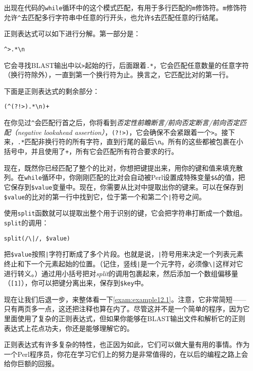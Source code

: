 出现在代码的\verb|while|循环中的这个模式匹配，有用于多行匹配的\verb|m|修饰符。\verb|m|修饰符允许\verb|^|去匹配多行字符串中任意的行开头，也允许\verb|$|去匹配任意的行结尾。

正则表达式可以如下进行分解。第一部分是：

\begin{lstlisting}
^>.*\n
\end{lstlisting}

它会寻找BLAST输出中以\verb|>|起始的行，后面跟着\verb|.*|，它会匹配任意数量的任意字符（换行符除外），一直到第一个换行符为止。换言之，它匹配比对的第一行。

下面是正则表达式的剩余部分：

\begin{lstlisting}
(^(?!>).*\n)+
\end{lstlisting}

在你见过\verb|^|会匹配行首之后，你将看到\textit{否定性前瞻断言/前向否定断言/前向否定匹配（negative lookahead assertion）}，\verb|(?!>)|，它会确保不会紧跟着一个\verb|>|。接下来，\verb|.*|匹配非换行符的所有字符，直到行尾的最后\verb|\n|。所有的这些都被包裹在小括号中，并且使用了\verb|+|，所有它会匹配所有符合要求的行。

现在，既然你已经匹配了整个的比对，你想把键提出来，用你的键和值来填充散列。在\verb|while|循环中，你刚刚匹配的比对会自动被Perl设置成特殊变量\verb|$&|的值，把它保存到\verb|$value|变量中。现在，你需要从比对中提取出你的键来。可以在保存到\verb|$value|的比对的第一行中找到它，位于第一个和第二个\verb=|=符号之间。

使用\verb|split|函数就可以提取出整个用于识别的键，它会把字符串打断成一个数组。\verb|split|的调用：

\begin{lstlisting}
split(/\|/, $value)
\end{lstlisting}

把\verb|$value|按照\verb=|=字符打断成了多个片段。也就是说，\verb=|=符号用来决定一个列表元素终止和下一个元素起始的位置。（记住，竖线\verb=|=是一个元字符，必须像\verb=\|=这样对它进行转义。）通过用小括号把对\textit{split}的调用包裹起来，然后添加一个数组偏移量（\verb|[1]|），你可以把键分离出来，保存到\verb|$key|中。

现在让我们后退一步，来整体看一下\autoref{exam:example12.1}。注意，它非常简短——只有两页多一点，这还把注释也算在内了。尽管这并不是一个简单的程序，因为它里面使用了复杂的正则表达式，但如果你能够在BLAST输出文件和解析它的正则表达式上花点功夫，你还是能够理解它的。

正则表达式有许多复杂的特性，也正因为如此，它们可以做大量有用的事情。作为一个Perl程序员，你花在学习它们上的努力是非常值得的，在以后的编程之路上会给你巨额的回报。

